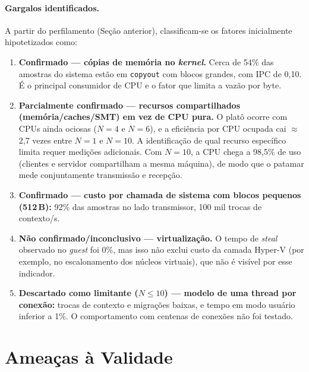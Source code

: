 \documentclass[12pt,a4paper]{article}
\newcommand{\SI}[2]{\mbox{#1\,#2}}
\begin{document}
\paragraph{Gargalos identificados.} A partir do perfilamento (Seção anterior),
classificam-se os fatores inicialmente hipotetizados como:
\begin{enumerate}
  \item \textbf{Confirmado --- cópias de memória no \textit{kernel}.} Cerca de
  54\% das amostras do sistema estão em \texttt{copyout} com blocos grandes, com
  IPC de 0,10. É o principal consumidor de CPU e o fator que limita a vazão
  por byte.
  \item \textbf{Parcialmente confirmado --- recursos compartilhados
  (memória/caches/SMT) em vez de CPU pura.} O platô ocorre com CPUs ainda ociosas
  ($N=4$ e $N=6$), e a eficiência por CPU ocupada cai $\approx$\,2,7 vezes entre
  $N=1$ e $N=10$. A identificação de qual recurso específico limita requer
  medições adicionais. Com $N=10$, a CPU chega a 98,5\% de uso
  (clientes e servidor compartilham a mesma máquina), de modo que o patamar
  mede conjuntamente transmissão e recepção.
  \item \textbf{Confirmado --- custo por chamada de sistema com blocos pequenos
  (\SI{512}{B}):} 92\% das amostras no lado transmissor, 100 mil trocas de
  contexto/s.
  \item \textbf{Não confirmado/inconclusivo --- virtualização.} O tempo de
  \textit{steal} observado no \textit{guest} foi 0\%, mas isso não exclui custo
  da camada Hyper-V (por exemplo, no escalonamento dos núcleos virtuais), que
  não é visível por esse indicador.
  \item \textbf{Descartado como limitante ($N\le 10$) --- modelo de uma thread por
  conexão:} trocas de contexto e migrações baixas, e tempo em modo usuário
  inferior a 1\%. O comportamento com centenas de conexões não foi testado.
\end{enumerate}

\section{Ameaças à Validade}
\end{document}
